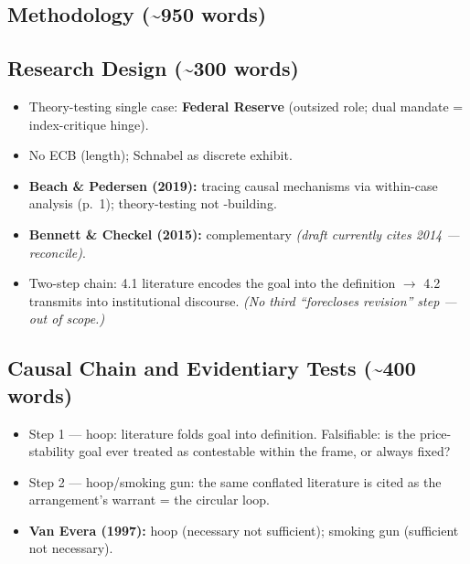 \documentclass[12pt,a4paper]{article}
\begin{document}
\begin{doublespace}
\section{Methodology (\textasciitilde950 words)}

\subsection{Research Design (\textasciitilde300 words)}
\begin{itemize}
    \item Theory-testing single case: \textbf{Federal Reserve} (outsized role; dual mandate = index-critique hinge).
    \item No ECB (length); Schnabel as discrete exhibit.
    \item \textbf{Beach \& Pedersen (2019):} tracing causal mechanisms via within-case analysis (p.\ 1); theory-testing not -building.
    \item \textbf{Bennett \& Checkel (2015):} complementary \textit{(draft currently cites 2014 --- reconcile)}.
    \item Two-step chain: 4.1 literature encodes the goal into the definition $\rightarrow$ 4.2 transmits into institutional discourse. \textit{(No third ``forecloses revision'' step --- out of scope.)}
\end{itemize}

\subsection{Causal Chain and Evidentiary Tests (\textasciitilde400 words)}
\begin{itemize}
    \item Step 1 --- hoop: literature folds goal into definition. Falsifiable: is the price-stability goal ever treated as contestable within the frame, or always fixed?
    \item Step 2 --- hoop/smoking gun: the same conflated literature is cited as the arrangement's warrant = the circular loop.
    \item \textbf{Van Evera (1997):} hoop (necessary not sufficient); smoking gun (sufficient not necessary).
\end{itemize}


\end{doublespace}
\end{document}
